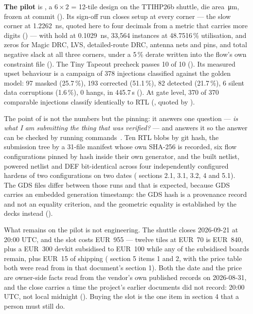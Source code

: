\textbf{The pilot} is , a
$6\times2$ = 12-tile design on the TTIHP26b shuttle, die area
\,\si{\um}, frozen at commit
 (). Its sign-off run closes setup at
every corner --- the slow corner at \qty{+1.2262}{\nano\second}, quoted
here to four decimals from a metric that carries more digits
() --- with hold at
\qty{+0.1029}{\nano\second}, 33{,}564 instances at 48.7516\,\%
utilisation, and zeros for Magic DRC, LVS, detailed-route DRC, antenna
nets and pins, and total negative slack at all three corners, under a
5\,\% derate written into the flow's own constraint file
(). The Tiny Tapeout precheck passes 10 of 10
(). Its measured upset behaviour is a campaign of
378 injections classified against the golden model: 97 masked
(25.7\,\%), 193 corrected (51.1\,\%), 82 detected (21.7\,\%), 6 silent
data corruptions (1.6\,\%), 0 hangs, in 445.7\,s
(). At gate level, 370 of 370 comparable
injections classify identically to RTL (, quoted
by ).

The point of  is not the numbers but the pinning: it answers
one question --- \emph{is what I am submitting the thing that was
verified?} --- and answers it so the answer can be checked by running
commands~\cite{lamb2022}. Ten RTL blobs by git hash, the submission tree
by a 31-file manifest whose own SHA-256 is recorded, six flow configurations pinned
by hash inside their own generator, and the built netlist, powered
netlist and DEF bit-identical across four independently configured
hardens of two configurations on two dates
( sections 2.1, 3.1, 3.2, 4 and 5.1). The GDS files differ
between those runs and that is expected, because GDS carries an embedded
generation timestamp: the GDS hash is a provenance record and not an
equality criterion, and the geometric equality is established by the
decks instead ().

What remains on the pilot is not engineering. The shuttle closes
2026-09-21 at 20:00 UTC, and the slot costs EUR~955 --- twelve tiles
at EUR~70 is EUR~840, plus a EUR~300 devkit subsidised to
EUR~100 while any of the subsidised boards remain, plus EUR~15 of
shipping ( section 5 items 1 and 2, with the price table
both were read from in that document's section 1). Both the date and the price are
owner-side facts read from the vendor's own published records on
2026-08-31, and the close carries a time the project's earlier documents
did not record: 20:00 UTC, not local midnight ().
Buying the slot is the one item in  section 4 that a
person must still do.

